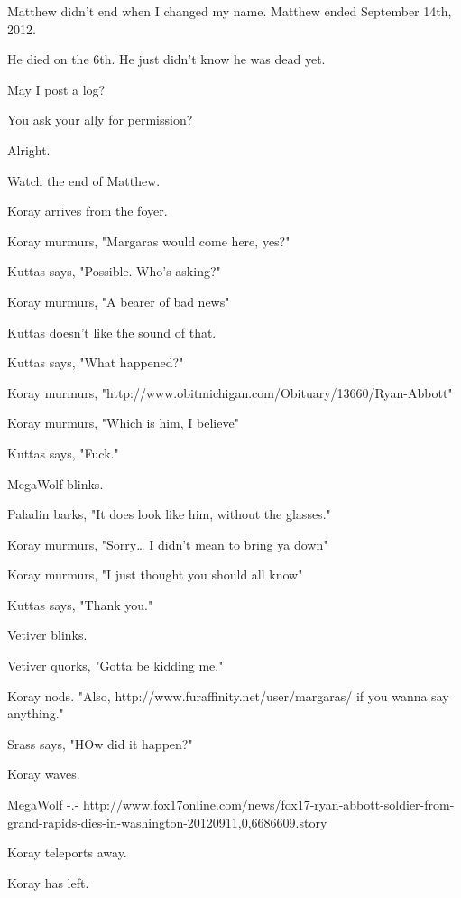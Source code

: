 \label{furry:margaras}
\noindent Matthew didn't end when I changed my name. Matthew ended September 14th, 2012.

\begin{ally}
He died on the 6th. He just didn't know he was dead yet.
\end{ally}
May I post a log?

\begin{ally}
You ask your ally for permission?
\end{ally}
Alright.

Watch the end of Matthew.
\newpage

\begin{hangparas}{2em}{1}
Koray arrives from the foyer.

Koray murmurs, "Margaras would come here, yes?"

Kuttas says, "Possible. Who's asking?"

Koray murmurs, "A bearer of bad news"

Kuttas doesn't like the sound of that.

Kuttas says, "What happened?"

Koray murmurs, "http://www.obitmichigan.com/Obituary/13660/Ryan-Abbott"

Koray murmurs, "Which is him, I believe"

Kuttas says, "Fuck."

MegaWolf blinks.

Paladin barks, "It does look like him, without the glasses."

Koray murmurs, "Sorry\ldots{} I didn't mean to bring ya down"

Koray murmurs, "I just thought you should all know"

Kuttas says, "Thank you."

Vetiver blinks.

Vetiver quorks, "Gotta be kidding me."

Koray nods. "Also, http://www.furaffinity.net/user/margaras/ if you wanna say anything."

Srass says, "HOw did it happen?"

Koray waves.

MegaWolf -.- http://www.fox17online.com/news/fox17-ryan-abbott-soldier-from-grand-rapids-dies-in-washington-20120911,0,6686609.story

Koray teleports away.

Koray has left.


\end{hangparas}
